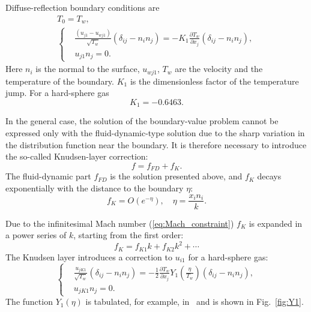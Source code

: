 \documentclass[english,a4paper,10pt]{article}
\newcommand{\pder}[2][]{\frac{\partial#1}{\partial#2}}
\begin{document}
Diffuse-reflection boundary conditions are
\begin{gather}
	T_0 = T_w, \label{eq:bound:T} \\
	\left\{
	\begin{aligned}
		& \frac{(u_{j1}-u_{wj1})}{\sqrt{T_w}}(\delta_{ij}-n_in_j) = 
			-K_1\pder[T_w]{x_j}(\delta_{ij}-n_in_j), \\
		& u_{j1}n_j = 0.
	\end{aligned}
	\right. \label{eq:bound:v}
\end{gather}
Here \(n_i\) is the normal to the surface, \(u_{wj1}\), \(T_w\) are the velocity and the temperature of the boundary.
\(K_1\) is the dimensionless factor of the temperature jump. For a hard-sphere gas
\[ K_1 = -0.6463. \]

In the general case, the solution of the boundary-value problem cannot be expressed only
with the fluid-dynamic-type solution due to the sharp variation in the distribution function
near the boundary.
It is therefore necessary to introduce the so-called Knudsen-layer correction:
\begin{equation}
	f = f_{FD} + f_K.
\end{equation}
The fluid-dynamic part \(f_{FD}\) is the solution presented above,
and \(f_K\) decays exponentially with the distance to the boundary \(\eta\):
\begin{equation}
	f_K = O\left(e^{-\eta}\right), \quad \eta = \frac{x_in_i}k.
\end{equation}

Due to the infinitesimal Mach number (\ref{eq:Mach_constraint}) \(f_K\) is expanded
in a power series of \(k\), starting from the first order:
\[ f_K = f_{K1} k + f_{K2} k ^ 2 + \cdots \]
The Knudsen layer introduces a correction to \(u_{i1}\) for a hard-sphere gas:
\begin{equation}
	\left\{
	\begin{aligned}
		& \frac{u_{jK1}}{\sqrt{T_w}}(\delta_{ij}-n_in_j) = 
			-\frac12\pder[T_w]{x_j} Y_1\left(\frac\eta{T_w}\right) (\delta_{ij}-n_in_j), \\
		& u_{jK1}n_j = 0.
	\end{aligned}
	\right. \label{eq:bound:v_K}
\end{equation}
The function \(Y_1(\eta)\) is tabulated, for example, in~\cite{Sone2002, Sone2007} and is shown in Fig.~\ref{fig:Y1}.
\end{document}

